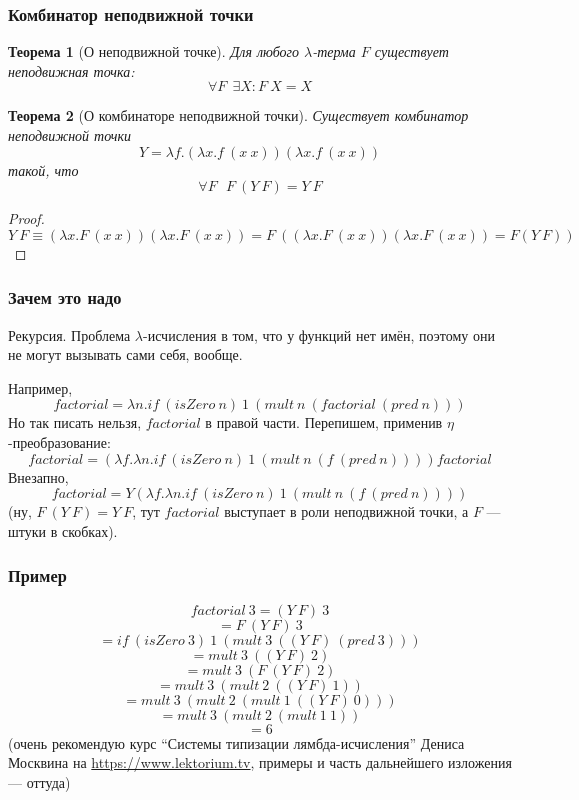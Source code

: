 \documentclass[xetex,mathserif,serif]{beamer}
\newtheorem{rustheorem}{Теорема}
\begin{document}
    \begin{frame}
        \frametitle{Комбинатор неподвижной точки}
        \begin{rustheorem}[О неподвижной точке]
            Для любого $\lambda$-терма $F$ существует неподвижная точка:
            $$\forall F\ \ \exists X : F\ X = X$$
            \vspace{-5mm}
        \end{rustheorem}
        \vspace{-5mm}
        \begin{rustheorem}[О комбинаторе неподвижной точки]
            Существует комбинатор неподвижной точки
            $$Y = \lambda f.(\lambda x.f\ (x\ x)) (\lambda x.f\ (x\ x))$$
            такой, что 
            $$\forall F\ \ \ F\ (Y\ F) = Y\ F$$
        \end{rustheorem}
        \vspace{-5mm}
        \begin{proof}
            \vspace{-7mm}
            $$Y\ F \equiv (\lambda x.F\ (x\ x))(\lambda x.F\ (x\ x)) 
                = F\ ((\lambda x.F\ (x\ x))(\lambda x.F\ (x\ x)) = F(Y\ F))$$
            \vspace{-10mm}
        \end{proof}
    \end{frame}

    \begin{frame}
        \frametitle{Зачем это надо}
        Рекурсия. Проблема $\lambda$-исчисления в том, что у функций нет имён, поэтому они не могут 
        вызывать сами себя, вообще.
        
        Например,
        $$factorial = \lambda n. if\ (isZero\ n)\ 1\ (mult\ n\ (factorial\ (pred\ n)))$$
        Но так писать нельзя, $factorial$ в правой части. Перепишем, применив $\eta$-преобразование:
        $$factorial = (\lambda f.\lambda n.if\ (isZero\ n)\ 1\ (mult\ n\ (f\ (pred\ n)))) factorial$$
        Внезапно, 
        $$factorial = Y (\lambda f.\lambda n.if\ (isZero\ n)\ 1\ (mult\ n\ (f\ (pred\ n))))$$
        (ну, $F\ (Y\ F) = Y\ F$, тут $factorial$ выступает в роли неподвижной точки, а $F$ --- 
        штуки в скобках).
    \end{frame}

    \begin{frame}
        \frametitle{Пример}
        $$factorial\ 3 = (Y\ F)\ 3$$
        $$= F\ (Y\ F)\ 3$$
        $$= if\ (isZero\ 3)\ 1\ (mult\ 3\ ((Y\ F)\ (pred\ 3)))$$
        $$= mult\ 3\ ((Y\ F)\ 2)$$
        $$= mult\ 3\ (F\ (Y\ F)\ 2)$$
        $$= mult\ 3\ (mult\ 2\ ((Y\ F)\ 1))$$
        $$= mult\ 3\ (mult\ 2\ (mult\ 1\ ((Y\ F)\ 0)))$$
        $$= mult\ 3\ (mult\ 2\ (mult\ 1\ 1))$$
        $$= 6$$
        (очень рекомендую курс ``Системы типизации лямбда-исчисления'' Дениса Москвина на \url{https://www.lektorium.tv}, примеры и часть дальнейшего изложения --- оттуда)
    \end{frame}
\end{document}
